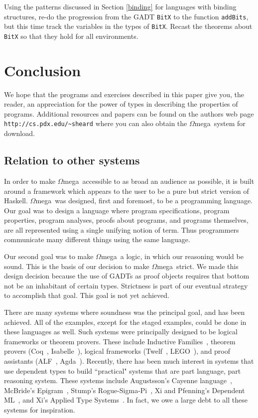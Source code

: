 \documentclass[11pt,twoside,A4]{llncs}
\newcommand{\om}{\emph{$\Omega$}mega}
\begin{document}
\begin{exercise}
Using the patterns discussed in Section \ref{binding} for 
languages with binding structures, re-do the progression
from the GADT {\tt BitX} to the function {\tt addBits}, but this time track
the variables in the types of {\tt BitX}. Recast the theorems
about {\tt BitX} so that they hold for all environments.
\end{exercise}

\section{Conclusion}

We hope that the programs and exercises described in this paper
give you, the reader, an appreciation for the power of types
in describing the properties of programs. Additional
resources and papers can be found on the authors web page
\verb+http://cs.pdx.edu/~sheard+ where you can also
obtain the \om\ system for download.

\subsection{Relation to other systems}

In order to make \om\ accessible to as broad an audience as possible,
it is built around a framework which appears to the user to be a
pure but strict version of Haskell. \om\ was designed, first and
foremost, to be a programming language. Our goal was to design a
language where program specifications, program properties, program
analyses, proofs about programs, and programs themselves, are all
represented using a single unifying notion of term. Thus programmers
communicate many different things using the same language.

Our second goal was to make \om\ a logic, in which our reasoning would
be sound. This is the basis of our decision to make \om\ strict. We
made this design decision because the use of GADTs as proof objects
requires that bottom not be an inhabitant of certain types. Strictness
is part of our eventual strategy to accomplish that goal. This goal is
not yet achieved.

There are many systems where soundness was the principal goal, and has been
achieved. All of the examples, except for the staged examples, could be done in
these languages as well. Such systems were principally designed to be logical
frameworks or theorem provers. These include Inductive
Families~\cite{Coquand:1994:IDT,Dybjer:1999:FAI}, theorem provers (Coq~\cite{COQ74},
Isabelle~\cite{Paulson90lacs}), logical frameworks (Twelf~\cite{CADE99*202},
LEGO~\cite{LuoPollack92}), and proof assistants (ALF~\cite{oai:CiteSeerPSU:38734},
Agda~\cite{Agda}). Recently, there has been much interest in systems that use
dependent types to build ``practical" systems that are part language, part
reasoning system. These systems include Augustsson's Cayenne
language~\cite{oai:CiteSeerPSU:339817,Augustsson:1999:CLD}, McBride's
Epigram~\cite{epigram}, Stump's Rogue-Sigma-Pi~\cite{Rogue,RSP1}, Xi and Pfenning's
Dependent ML~\cite{Xi:1998:EAB,Davies97}, and Xi's Applied Type
Systems~\cite{ATS2004,ATS2005}. In fact, we owe a large debt to all these
systems for inspiration.
 
\end{document}

